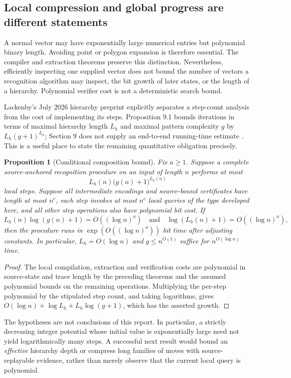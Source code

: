 \documentclass[11pt]{article}
\newtheorem{proposition}[theorem]{Proposition}
\theoremstyle{definition}\newtheorem{definition}[theorem]{Definition}
\theoremstyle{remark}\newtheorem{remark}[theorem]{Remark}
\begin{document}
\subsection{Local compression and global progress are different statements}
A normal vector may have exponentially large numerical entries but polynomial
binary length. Avoiding point or polygon expansion is therefore essential.
The compiler and extraction theorems preserve this distinction. Nevertheless,
efficiently inspecting one supplied vector does not bound the number of vectors
a recognition algorithm may inspect, the bit growth of later states, or the
length of a hierarchy. Polynomial verifier cost is not a deterministic search
bound.

Lackenby's July 2026 hierarchy preprint explicitly separates a step-count analysis
from the cost of implementing its steps. Proposition 9.1 bounds iterations in
terms of maximal hierarchy length $L_h$ and maximal pattern complexity $g$ by
$L_h(g+1)^{L_h}$; Section 9 does not supply an end-to-end running-time estimate
\cite[Section 9]{lackenby}. This is a useful place to state the remaining
quantitative obligation precisely.

\begin{proposition}[Conditional composition bound]
\label{prop:global}
Fix $a\ge1$. Suppose a complete source-anchored recognition procedure on an input of length
$n$ performs at most
\[
 L_h(n)\bigl(g(n)+1\bigr)^{L_h(n)}
\]
local steps. Suppose all intermediate encodings and source-bound certificates
have length at most $n^c$, each step invokes at most $n^c$ local queries of the
type developed here, and all \emph{other} step operations also have polynomial
bit cost. If
\[
 L_h(n)\log(g(n)+1)=O((\log n)^a)
 \quad\text{and}\quad \log(L_h(n)+1)=O((\log n)^a),
\]
then the procedure runs in $\exp(O((\log n)^a))$ bit time after adjusting constants.
In particular, $L_h=O(\log n)$ and $g\le n^{O(1)}$ suffice for
$n^{O(\log n)}$ time.
\end{proposition}
\begin{proof}
The local compilation, extraction and verification costs are polynomial in
source-state and trace length by the preceding theorems and the assumed
polynomial bounds on the remaining operations. Multiplying the per-step
polynomial by the stipulated step count, and taking logarithms, gives
$O(\log n)+\log L_h+L_h\log(g+1)$, which has the asserted growth.
\end{proof}

The hypotheses are not conclusions of this report. In particular, a strictly
decreasing integer potential whose initial value is exponentially large need
not yield logarithmically many steps. A successful next result would bound an
\emph{effective} hierarchy depth or compress long families of moves with
source-replayable evidence, rather than merely observe that the current local
query is polynomial.
\end{document}
